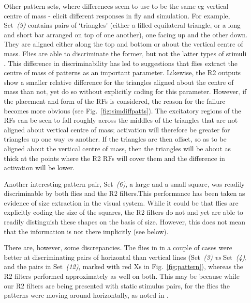 
Other pattern sets, 
where differences seem to use to be the same eg vertical centre of mass - elicit different responses in fly and simulation.
For example, Set~\emph{(9)} contains pairs of `triangles' (either a filled equilateral triangle, or a long and short bar arranged on top of one another), one facing up and the other down.
They are aligned either along the top and bottom or about the vertical centre of mass.
Flies are able to discriminate the former, but not the latter types of stimuli \cite{Ernst1999}. This difference in discriminability has led to suggestions that flies extract the centre of mass of patterns as an important parameter.
Likewise, the R2 outputs show a smaller relative difference for the triangles aligned about the centre of mass than not, yet do so without explicitly coding for this parameter.
However, if the placement and form of the RFs is considered, the reason for the failure becomes more obvious (see Fig.~\ref{fig:simdiffpatts}).
The excitatory regions of the RFs can be seen to fall roughly across the middles of the triangles that are not aligned about vertical centre of mass; activation will therefore be greater for triangles up one way \emph{vs} another.
If the triangles are then offset, so as to be aligned about the vertical centre of mass, then the triangles will be about as thick at the points where the R2 RFs will cover them and the difference in activation will be lower.

Another interesting pattern pair, Set~\emph{(6)}, a large and a small square, was readily discriminable by both flies and the R2 filters.This performance has been taken as evidence of size extraction in the visual system. While it could be that flies are explicitly coding the size of the squares, the R2 filters do not and yet are able to readily distinguish these shapes on the basis of size.
However, this does not mean that the information is not there implicitly (see below). 


There are, however, some discrepancies.
The flies in \cite{Ernst1999} in a couple of cases were better at discriminating pairs of horizontal than vertical lines (Set~\emph{(3)} \emph{vs} Set~\emph{(4)}, and the pairs in Set~\emph{(12)}, marked with red Xs in Fig.~\ref{fig:pattern}), whereas the R2 filters performed approximately as well on both.
This may be because while our R2 filters are being presented with static stimulus pairs, for the flies the patterns were moving around horizontally, as noted in \cite{Ernst1999}.
 

